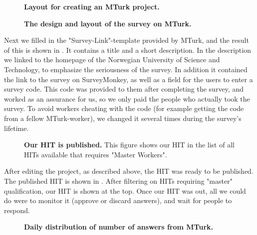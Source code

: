 \begin{figure}[t]
\centering
{}
\caption[Layout for creating an MTurk project]{\textbf{Layout for creating an MTurk project.}} 
\label{fig:amtedit}
\end{figure}

\begin{figure}[t]
\centering
{}
\caption[The design and layout of the survey on MTurk]{\textbf{The design and layout of the survey on MTurk.}} 
\label{fig:amtlayout}
\end{figure}

Next we filled in the "Survey-Link"-template provided by MTurk, and the result of this is shown in . It contains a title and a short description. In the description we linked to the homepage of the Norwegian University of Science and Technology, to emphasize the seriousness of the survey. In addition it contained the link to the survey on SurveyMonkey, as well as a field for the users to enter a survey code. This code was provided to them after completing the survey, and worked as an assurance for us, so we only paid the people who actually took the survey. To avoid workers cheating with the code (for example getting the code from a fellow MTurk-worker), we changed it several times during the survey's lifetime. 

\begin{figure}[t]
\centering
{}
\caption[Our HIT is published]{\textbf{Our HIT is published.} This figure shows our HIT in the list of all HITs available that requires "Master Workers".} 
\label{fig:hitout}
\end{figure}

After editing the project, as described above, the HIT was ready to be published. The published HIT is shown in . After filtering on HITs requiring "master" qualification, our HIT is shown at the top. 
Once our HIT was out, all we could do were to monitor it (approve or discard answers), and wait for people to respond. 

\begin{figure}[t]
\centering
{}
\caption[Daily distribution of number of answers from MTurk]{\textbf{Daily distribution of number of answers from MTurk.}} 
\label{fig:answersamt}
\end{figure}

